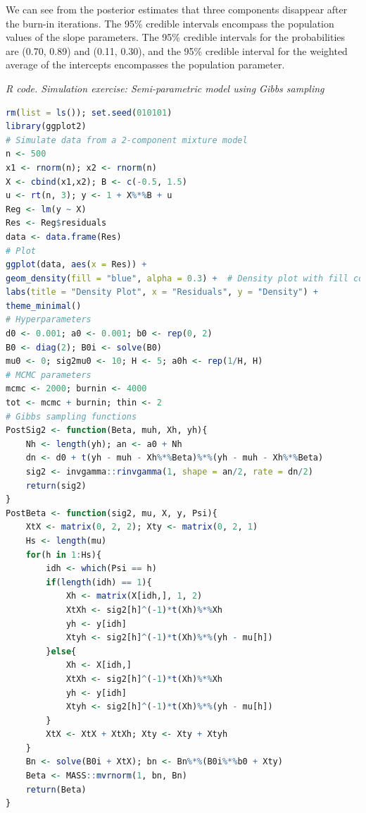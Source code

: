We can see from the posterior estimates that three components disappear after the burn-in iterations. The 95\% credible intervals encompass the population values of the slope parameters. The 95\% credible intervals for the probabilities are (0.70, 0.89) and (0.11, 0.30), and the 95\% credible interval for the weighted average of the intercepts encompasses the population parameter.

\begin{tcolorbox}[enhanced,width=4.67in,center upper,
	fontupper=\large\bfseries,drop shadow southwest,sharp corners]
	\textit{R code. Simulation exercise: Semi-parametric model using Gibbs sampling}
	\begin{VF}
		\begin{lstlisting}[language=R]
rm(list = ls()); set.seed(010101)
library(ggplot2)
# Simulate data from a 2-component mixture model
n <- 500
x1 <- rnorm(n); x2 <- rnorm(n)
X <- cbind(x1,x2); B <- c(-0.5, 1.5)
u <- rt(n, 3); y <- 1 + X%*%B + u
Reg <- lm(y ~ X)
Res <- Reg$residuals
data <- data.frame(Res)
# Plot
ggplot(data, aes(x = Res)) +
geom_density(fill = "blue", alpha = 0.3) +  # Density plot with fill color
labs(title = "Density Plot", x = "Residuals", y = "Density") +
theme_minimal()
# Hyperparameters
d0 <- 0.001; a0 <- 0.001; b0 <- rep(0, 2)
B0 <- diag(2); B0i <- solve(B0)
mu0 <- 0; sig2mu0 <- 10; H <- 5; a0h <- rep(1/H, H)
# MCMC parameters
mcmc <- 2000; burnin <- 4000
tot <- mcmc + burnin; thin <- 2
# Gibbs sampling functions
PostSig2 <- function(Beta, muh, Xh, yh){
	Nh <- length(yh); an <- a0 + Nh
	dn <- d0 + t(yh - muh - Xh%*%Beta)%*%(yh - muh - Xh%*%Beta)
	sig2 <- invgamma::rinvgamma(1, shape = an/2, rate = dn/2)
	return(sig2)
}
PostBeta <- function(sig2, mu, X, y, Psi){
	XtX <- matrix(0, 2, 2); Xty <- matrix(0, 2, 1)
	Hs <- length(mu)
	for(h in 1:Hs){
		idh <- which(Psi == h)
		if(length(idh) == 1){
			Xh <- matrix(X[idh,], 1, 2)
			XtXh <- sig2[h]^(-1)*t(Xh)%*%Xh
			yh <- y[idh]
			Xtyh <- sig2[h]^(-1)*t(Xh)%*%(yh - mu[h])
		}else{
			Xh <- X[idh,]
			XtXh <- sig2[h]^(-1)*t(Xh)%*%Xh
			yh <- y[idh]
			Xtyh <- sig2[h]^(-1)*t(Xh)%*%(yh - mu[h])
		}
		XtX <- XtX + XtXh; Xty <- Xty + Xtyh
	}
	Bn <- solve(B0i + XtX); bn <- Bn%*%(B0i%*%b0 + Xty)
	Beta <- MASS::mvrnorm(1, bn, Bn)
	return(Beta)
}
\end{lstlisting}
	\end{VF}
\end{tcolorbox}

